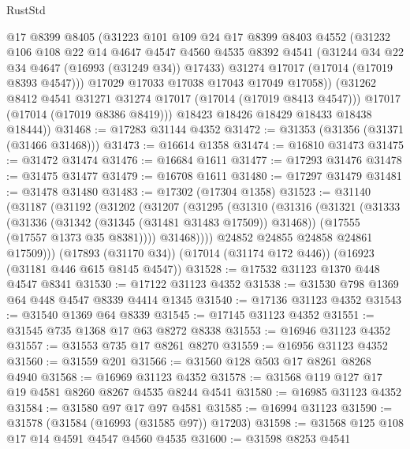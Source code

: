 \begin{lexlean}{RustStd}
\begin{coremodule}
{\begin{coremodule}
{{{{{{{{{{{{{{{{{{{{{{{{{{{{{{{{{{{{{{{{{{{{{{{{{{{{{{{            @17
            @8399
            @8405
            (@31223
              @101
              @109
              @24
              @17
              @8399
              @8403
              @4552
              (@31232
                @106
                @108
                @22
                @14
                @4647
                @4547
                @4560
                @4535
                @8392
                @4541
                (@31244 @34 @22 @34 @4647 (@16993 (@31249 @34)) @17433)
                @31274
                @17017
                (@17014 (@17019 @8393 @4547)))
              @17029
              @17033
              @17038
              @17043
              @17049
              @17058))
          (@31262 @8412 @4541 @31271 @31274 @17017 (@17014 (@17019 @8413 @4547)))
          @17017
          (@17014 (@17019 @8386 @8419)))
        @18423
        @18426
        @18429
        @18433
        @18438
        @18444))
@31468 := @17283 @31144 @4352
@31472 := @31353 (@31356 (@31371 (@31466 @31468)))
@31473 := @16614 @1358
@31474 := @16810 @31473
@31475 := @31472 @31474
@31476 := @16684 @1611
@31477 := @17293 @31476
@31478 := @31475 @31477
@31479 := @16708 @1611
@31480 := @17297 @31479
@31481 := @31478 @31480
@31483 := @17302 (@17304 @1358)
@31523 := @31140
    (@31187
      (@31192
        (@31202
          (@31207
            (@31295
              (@31310
                (@31316
                  (@31321
                    (@31333
                      (@31336 (@31342 (@31345 (@31481 @31483 @17509)) @31468))
                      (@17555 (@17557 @1373 @35 @8381))))
                  @31468))))
          @24852
          @24855
          @24858
          @24861
          @17509)))
    (@17893 (@31170 @34))
    (@17014 (@31174 @172 @446))
    (@16923 (@31181 @446 @615 @8145 @4547))
@31528 := @17532 @31123 @1370 @448 @4547 @8341
@31530 := @17122 @31123 @4352
@31538 := @31530 @798 @1369 @64 @448 @4547 @8339 @4414 @1345
@31540 := @17136 @31123 @4352
@31543 := @31540 @1369 @64 @8339
@31545 := @17145 @31123 @4352
@31551 := @31545 @735 @1368 @17 @63 @8272 @8338
@31553 := @16946 @31123 @4352
@31557 := @31553 @735 @17 @8261 @8270
@31559 := @16956 @31123 @4352
@31560 := @31559 @201
@31566 := @31560 @128 @503 @17 @8261 @8268 @4940
@31568 := @16969 @31123 @4352
@31578 := @31568 @119 @127 @17 @19 @4581 @8260 @8267 @4535 @8244 @4541
@31580 := @16985 @31123 @4352
@31584 := @31580 @97 @17 @97 @4581
@31585 := @16994 @31123
@31590 := @31578 (@31584 (@16993 (@31585 @97)) @17203)
@31598 := @31568 @125 @108 @17 @14 @4591 @4547 @4560 @4535
@31600 := @31598 @8253 @4541
}}}}}}}}}}}}}}}}}}}}}}}}}}}}}}}}}}}}}}}}}}}}}}}}}}}}}}}
\end{coremodule}}
\end{coremodule}
\end{lexlean}

